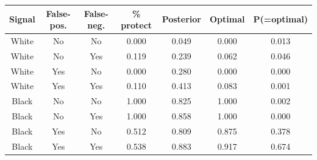 \begin{table}[H]\centering \scriptsize \begin{tabular}{ccccccc} \hline \hline
\textbf{Signal}&\textbf{False-pos.}&\textbf{False-neg.}&\textbf{\% protect}& \textbf{Posterior} & \textbf{Optimal} & \textbf{P(=optimal)} \\ \hline
White&No&No&0.000&0.049&0.000&0.013\\
White&No&Yes&0.119&0.239&0.062&0.046\\
White&Yes&No&0.000&0.280&0.000&0.000\\
White&Yes&Yes&0.110&0.413&0.083&0.001\\
Black&No&No&1.000&0.825&1.000&0.002\\
Black&No&Yes&1.000&0.858&1.000&0.000\\
Black&Yes&No&0.512&0.809&0.875&0.378\\
Black&Yes&Yes&0.538&0.883&0.917&0.674\\
\hline \end{tabular} \end{table}

